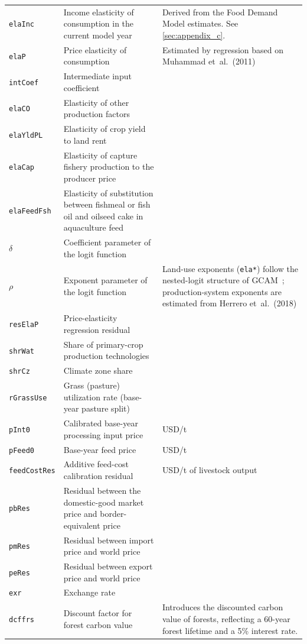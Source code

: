 \begin{xltabular}{\linewidth}{l X X}
  \texttt{elaInc} & Income elasticity of consumption in the current model year & Derived from the Food Demand Model estimates. See \cref{sec:appendix_c}. \\
  \texttt{elaP} & Price elasticity of consumption & Estimated by regression based on Muhammad et~al.~(2011) \\
  \texttt{intCoef} & Intermediate input coefficient & \\
  \texttt{elaCO} & Elasticity of other production factors & \\
  \texttt{elaYldPL} & Elasticity of crop yield to land rent & \\
  \texttt{elaCap} & Elasticity of capture fishery production to the producer price & \\
  \texttt{elaFeedFsh} & Elasticity of substitution between fishmeal or fish oil and oilseed cake in aquaculture feed & \\
  $\delta$ & Coefficient parameter of the logit function & \\
  $\rho$ & Exponent parameter of the logit function & Land-use exponents (\texttt{ela*}) follow the nested-logit structure of GCAM~\cite{calvinGCAMV51Representing2019}; production-system exponents are estimated from Herrero et~al.~(2018) \\
  \texttt{resElaP} & Price-elasticity regression residual & \\
  \texttt{shrWat} & Share of primary-crop production technologies & \\
  \texttt{shrCz} & Climate zone share & \\
  \texttt{rGrassUse} & Grass (pasture) utilization rate (base-year pasture split) & \\
  \texttt{pInt0} & Calibrated base-year processing input price & USD/t \\
  \texttt{pFeed0} & Base-year feed price & USD/t \\
  \texttt{feedCostRes} & Additive feed-cost calibration residual & USD/t of livestock output \\
  \texttt{pbRes} & Residual between the domestic-good market price and border-equivalent price & \\
  \texttt{pmRes} & Residual between import price and world price & \\
  \texttt{peRes} & Residual between export price and world price & \\
  \texttt{exr} & Exchange rate & \\
  \texttt{dcffrs} & Discount factor for forest carbon value & Introduces the discounted carbon value of forests, reflecting a 60-year forest lifetime and a 5\% interest rate. \\

\end{xltabular}
